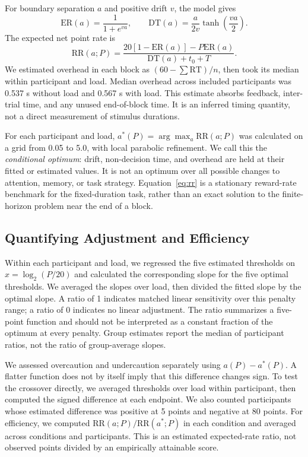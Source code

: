 \documentclass[10pt,letterpaper]{article}
\newcommand{\RR}{\mathrm{RR}}
\newcommand{\ER}{\mathrm{ER}}
\begin{document}
For boundary separation $a$ and positive drift $v$, the model gives
\begin{equation}
\ER(a)=\frac{1}{1+e^{va}},\qquad
\mathrm{DT}(a)=\frac{a}{2v}\tanh\!\left(\frac{va}{2}\right).
\end{equation}
The expected net point rate is
\begin{equation}
\RR(a;P)=\frac{20[1-\ER(a)]-P\ER(a)}{\mathrm{DT}(a)+t_0+T}.
\label{eq:rr}
\end{equation}
We estimated overhead in each block as $(60-\sum\mathrm{RT})/n$, then took its median within participant and load. Median overhead across included participants was 0.537 s without load and 0.567 s with load. This estimate absorbs feedback, inter-trial time, and any unused end-of-block time. It is an inferred timing quantity, not a direct measurement of stimulus durations.

For each participant and load, $a^*(P)=\arg\max_a\RR(a;P)$ was calculated on a grid from 0.05 to 5.0, with local parabolic refinement. We call this the \emph{conditional optimum}: drift, non-decision time, and overhead are held at their fitted or estimated values. It is not an optimum over all possible changes to attention, memory, or task strategy. Equation~\ref{eq:rr} is a stationary reward-rate benchmark for the fixed-duration task, rather than an exact solution to the finite-horizon problem near the end of a block.

\subsection{Quantifying Adjustment and Efficiency}
Within each participant and load, we regressed the five estimated thresholds on $x=\log_2(P/20)$ and calculated the corresponding slope for the five optimal thresholds. We averaged the slopes over load, then divided the fitted slope by the optimal slope. A ratio of 1 indicates matched linear sensitivity over this penalty range; a ratio of 0 indicates no linear adjustment. The ratio summarizes a five-point function and should not be interpreted as a constant fraction of the optimum at every penalty. Group estimates report the median of participant ratios, not the ratio of group-average slopes.

We assessed overcaution and undercaution separately using $a(P)-a^*(P)$. A flatter function does not by itself imply that this difference changes sign. To test the crossover directly, we averaged thresholds over load within participant, then computed the signed difference at each endpoint. We also counted participants whose estimated difference was positive at 5 points and negative at 80 points. For efficiency, we computed $\RR(a;P)/\RR(a^*;P)$ in each condition and averaged across conditions and participants. This is an estimated expected-rate ratio, not observed points divided by an empirically attainable score.
\end{document}
